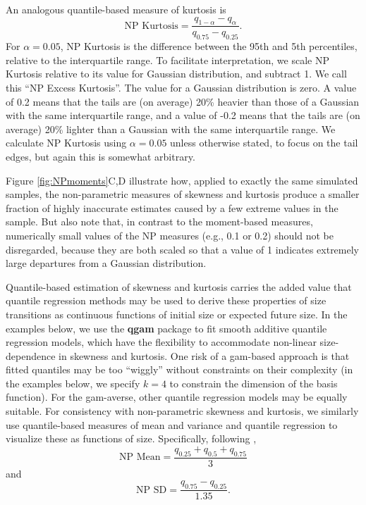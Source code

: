 \documentclass[12pt]{article}
\newcounter{box}
\newcommand{\be}{\begin{equation}}
\newcommand{\ee}{\end{equation}}
\begin{document}
An analogous quantile-based measure of kurtosis \citep{jones-etal-1994} is 
\be
\mbox{NP Kurtosis}  = \frac{q_{1-\alpha} - q_{\alpha}}{q_{0.75} - q_{0.25}}.
\label{eqn:NPkurt}
\ee
For $\alpha=0.05$, NP Kurtosis is the difference between the 95th and 5th percentiles, relative to the interquartile range. 
To facilitate interpretation, we scale NP Kurtosis relative to its value for Gaussian distribution, and subtract 1. 
We call this ``NP Excess Kurtosis''. 
The value for a Gaussian distribution is zero. 
A value of 0.2 means that the tails are (on average) 20\% heavier than those of a Gaussian with the same interquartile range, and a value of -0.2 means that the tails are (on average) 20\% lighter than a Gaussian with the same interquartile range. 
We calculate NP Kurtosis using $\alpha=0.05$ unless otherwise stated, to focus on the tail edges, but again this is somewhat arbitrary. 

Figure \ref{fig:NPmoments}C,D illustrate how, applied to exactly the same simulated samples, the non-parametric measures of skewness and kurtosis produce a smaller fraction of highly inaccurate estimates caused by a few extreme values in the sample. 
But also note that, in contrast to the moment-based measures, numerically small values of the NP measures (e.g., 0.1 or 0.2) should not be disregarded, because they are both scaled so that a value of 1 indicates extremely large departures from a Gaussian distribution. 

Quantile-based estimation of skewness and kurtosis carries the added value that quantile regression methods may be used to derive these properties of size transitions as continuous functions of initial size or expected future size. 
In the examples below, we use the \textbf{qgam} package to fit smooth additive quantile regression models, which have the flexibility to accommodate non-linear size-dependence in skewness and kurtosis. 
One risk of a gam-based approach is that fitted quantiles may be too ``wiggly'' without constraints on their complexity (in the examples below, we specify $k=4$ to constrain the dimension of the basis function). 
For the gam-averse, other quantile regression models may be equally suitable. 
For consistency with non-parametric skewness and kurtosis, we similarly use quantile-based measures of mean and variance and quantile regression to visualize these as functions of size. 
Specifically, following \cite{wan2014estimating},
\be
\mbox{NP Mean}  = \frac{q_{0.25} + q_{0.5} + q_{0.75}}{3}
\label{eqn:NPmean}
\ee
and
\be
\mbox{NP SD}  = \frac{q_{0.75} - q_{0.25}}{1.35}.
\label{eqn:NPsd}
\ee
\end{document}
